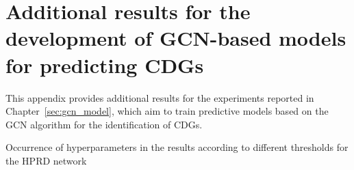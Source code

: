 \documentclass[ppgc, diss, english]{iiufrgs}
\begin{document}
\chapter{Additional results for the development of GCN-based models for predicting CDGs}
\label{sec:appendix_cap6}

This appendix provides additional results for the experiments reported in Chapter~\ref{sec:gcn_model}, which aim to train predictive models based on the GCN algorithm for the identification of CDGs.





\begin{table}[!th]
\caption{Occurrence of hyperparameters in the results according to different thresholds for the HPRD network \label{tab:occurrence_hyperparameters_hprd}}
\centering
 \begin{adjustbox}{scale=0.9,center}


\end{adjustbox}
\end{table}
\end{document}
